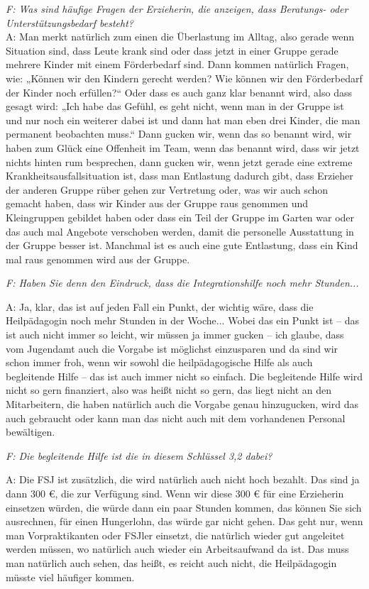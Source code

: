 \begin{linenumbers*}
\emph{F: Was sind häufige Fragen der Erzieherin, die anzeigen, dass Beratungs- oder Unterstützungsbedarf besteht?}\\
A: Man merkt natürlich zum einen die Überlastung im Alltag, also gerade wenn Situation sind, dass Leute krank sind oder dass jetzt in einer Gruppe gerade mehrere Kinder mit einem Förderbedarf sind. Dann kommen natürlich Fragen, wie: „Können wir den Kindern gerecht werden? Wie können wir den Förderbedarf der Kinder noch erfüllen?“ Oder dass es auch ganz klar benannt wird, also dass gesagt wird: „Ich habe das Gefühl, es geht nicht, wenn man in der Gruppe ist und nur noch ein weiterer dabei ist und dann hat man eben drei Kinder, die man permanent beobachten muss.“ Dann gucken wir, wenn das so benannt wird, wir haben zum Glück eine Offenheit im Team, wenn das benannt wird, dass wir jetzt nichts hinten rum besprechen, dann gucken wir, wenn jetzt gerade eine extreme Krankheitsausfallsituation ist, dass man Entlastung dadurch gibt, dass Erzieher der anderen Gruppe rüber gehen zur Vertretung oder, was wir auch schon gemacht haben, dass wir Kinder aus der Gruppe raus genommen und Kleingruppen gebildet haben oder dass ein Teil der Gruppe im Garten war oder das auch mal Angebote verschoben werden, damit die personelle Ausstattung in der Gruppe besser ist. Manchmal ist es auch eine gute Entlastung, dass ein Kind mal raus genommen wird aus der Gruppe.  

\emph{F: Haben Sie denn den Eindruck, dass die Integrationshilfe noch mehr Stunden...}

A: Ja, klar, das ist auf jeden Fall ein Punkt, der wichtig wäre, dass die Heilpädagogin noch mehr Stunden in der Woche... Wobei das ein Punkt ist -- das ist auch nicht immer so leicht, wir müssen ja immer gucken -- ich glaube, dass vom Jugendamt auch die Vorgabe ist möglichst einzusparen und da sind wir schon immer froh, wenn wir sowohl die heilpädagogische Hilfe als auch begleitende Hilfe -- das ist auch immer nicht so einfach. Die begleitende Hilfe wird nicht so gern finanziert, also was heißt nicht so gern, das liegt nicht an den Mitarbeitern, die haben natürlich auch die Vorgabe genau hinzugucken, wird das auch gebraucht oder kann man das nicht auch mit dem vorhandenen Personal bewältigen. 

\emph{F: Die begleitende Hilfe ist die in diesem Schlüssel 3,2 dabei?} 

A: Die FSJ ist zusätzlich, die wird natürlich auch nicht hoch bezahlt. Das sind ja dann 300 €, die zur Verfügung sind. Wenn wir diese 300 € für eine Erzieherin einsetzen würden, die würde dann ein paar Stunden kommen, das können Sie sich ausrechnen, für einen Hungerlohn, das würde gar nicht gehen. Das geht nur, wenn man Vorpraktikanten oder FSJler einsetzt, die natürlich wieder gut angeleitet werden müssen, wo natürlich auch wieder ein Arbeitsaufwand da ist. Das muss man natürlich auch sehen, das heißt, es reicht auch nicht, die Heilpädagogin müsste viel häufiger kommen.


\end{linenumbers*}
